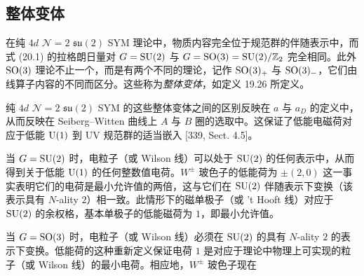 \subsection{整体变体}

在纯 $4d$ $\mathcal{N}=2$ $\mathfrak{su}(2)$ SYM 理论中，物质内容完全位于规范群的伴随表示中，而式 (20.1) 的拉格朗日量对 $G=\operatorname{SU}(2)$ 与 $G=\operatorname{SO}(3)=\operatorname{SU}(2)/\mathbb{Z}_2$ 完全相同。此外 $\operatorname{SO}(3)$ 理论不止一个，而是有两个不同的理论，记作 $\operatorname{SO}(3)_+$ 与 $\operatorname{SO}(3)_-$，它们由线算子内容的不同而区分。这些称为\emph{整体变体}，如定义 19.26 所定义。

\begin{proposition}[20.18]
纯 $4d$ $\mathcal{N}=2$ $\mathfrak{su}(2)$ SYM 的这些整体变体之间的区别反映在 $a$ 与 $a_D$ 的定义中，从而反映在 Seiberg--Witten 曲线上 $A$ 与 $B$ 圈的选取中。这保证了低能电磁荷对应于低能 $\operatorname{U}(1)$ 到 UV 规范群的适当嵌入 [339, Sect. 4.5]。
\end{proposition}

当 $G=\operatorname{SU}(2)$ 时，电粒子（或 Wilson 线）可以处于 $\operatorname{SU}(2)$ 的任何表示中，从而得到关于低能 $\operatorname{U}(1)$ 的任何整数值电荷。$W^\pm$ 玻色子的低能荷为 $\pm(2,0)$ 这一事实表明它们的电荷是最小允许值的两倍，这与它们在 $\operatorname{SU}(2)$ 伴随表示下变换（该表示具有 $N$-ality $2$）相一致。此情形下的磁单极子（或 't Hooft 线）对应于 $\operatorname{SU}(2)$ 的余权格，基本单极子的低能磁荷为 $1$，即最小允许值。

当 $G=\operatorname{SO}(3)$ 时，电粒子（或 Wilson 线）必须在 $\operatorname{SU}(2)$ 的具有 $N$-ality $2$ 的表示下变换。低能荷的这种重新定义保证电荷 $1$ 是对应于理论中物理上可实现的粒子（或 Wilson 线）的最小电荷。相应地，$W^\pm$ 玻色子现在

